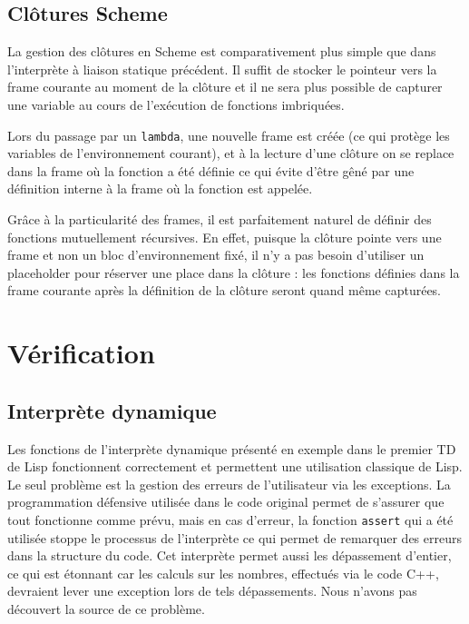 \documentclass[a4paper,11pt]{article}
\begin{document}
\subsection{Clôtures Scheme}

La gestion des clôtures en Scheme est comparativement plus simple que dans
l'interprète à liaison statique précédent. Il suffit de stocker le pointeur
vers la frame courante au moment de la clôture et il ne sera plus possible de
capturer une variable au cours de l'exécution de fonctions imbriquées.

Lors du passage par un \texttt{lambda}, une nouvelle frame est créée (ce qui
protège les variables de l'environnement courant), et à la lecture d'une clôture
on se replace dans la frame où la fonction a été définie ce qui évite d'être
gêné par une définition interne à la frame où la fonction est appelée.

Grâce à la particularité des frames, il est parfaitement naturel de définir des
fonctions mutuellement récursives. En effet, puisque la clôture pointe vers une
frame et non un bloc d'environnement fixé, il n'y a pas besoin d'utiliser un
placeholder pour réserver une place dans la clôture : les fonctions définies
dans la frame courante après la définition de la clôture seront quand même
capturées.

\section{Vérification}
 
 \subsection{Interprète dynamique}

 Les fonctions de l'interprète dynamique présenté en exemple dans le premier TD
 de Lisp fonctionnent correctement et permettent 
 une utilisation classique de Lisp.  
 Le seul problème est la gestion des erreurs de 
 l'utilisateur via les exceptions. La programmation défensive utilisée dans le 
 code original permet de s'assurer que tout fonctionne comme prévu, mais en cas 
 d'erreur, la fonction \texttt{assert} qui a été utilisée stoppe le processus de 
 l'interprète ce qui permet de remarquer des erreurs dans la structure du code.
 Cet interprète permet aussi les dépassement d'entier, ce qui est étonnant car 
 les calculs sur les nombres, effectués via le code C++, devraient lever une 
 exception lors de tels dépassements. Nous n'avons pas découvert la source de 
 ce problème.
 
\end{document}
